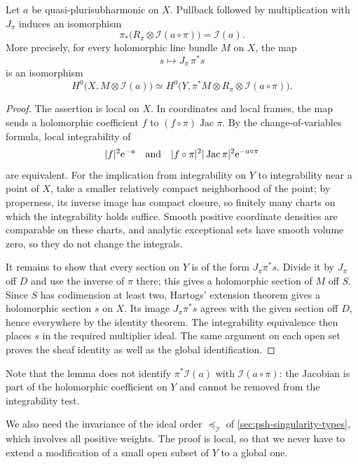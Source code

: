 \begin{lemma}\label{lem:adjoint-ideal-transform}
Let $a$ be quasi-plurisubharmonic on $X$. Pullback followed by multiplication with $J_\pi$ induces an isomorphism
\[
 \pi_*\bigl(R_\pi\otimes\mathcal I(a\circ\pi)\bigr)
       =\mathcal I(a).
\]
More precisely, for every holomorphic line bundle $M$ on $X$, the map
\[
 s\longmapsto J_\pi\,\pi^*s
\]
is an isomorphism
\[
 H^0\bigl(X,M\otimes\mathcal I(a)\bigr)
 \simeq H^0\bigl(Y,\pi^*M\otimes R_\pi
                         \otimes\mathcal I(a\circ\pi)\bigr).
\]
\end{lemma}
\begin{proof}
The assertion is local on $X$. In coordinates and local frames, the map sends a holomorphic coefficient $f$ to $(f\circ\pi)\operatorname{Jac}\pi$. By the change-of-variables formula, local integrability of
\[
 |f|^2\mathrm{e}^{-a}
 \quad\hbox{and}\quad
 |f\circ\pi|^2|\operatorname{Jac}\pi|^2\mathrm{e}^{-a\circ\pi}
\]
are equivalent. For the implication from integrability on $Y$ to integrability near a point of $X$, take a smaller relatively compact neighborhood of the point; by properness, its inverse image has compact closure, so finitely many charts on which the integrability holds suffice. Smooth positive coordinate densities are comparable on these charts, and analytic exceptional sets have smooth volume zero, so they do not change the integrals.

It remains to show that every section on $Y$ is of the form $J_\pi\pi^*s$. Divide it by $J_\pi$ off $D$ and use the inverse of $\pi$ there; this gives a holomorphic section of $M$ off $S$. Since $S$ has codimension at least two, Hartogs' extension theorem gives a holomorphic section $s$ on $X$. Its image $J_\pi\pi^*s$ agrees with the given section off $D$, hence everywhere by the identity theorem. The integrability equivalence then places $s$ in the required multiplier ideal. The same argument on each open set proves the sheaf identity as well as the global identification.
\end{proof}

Note that the lemma does not identify $\pi^*\mathcal I(a)$ with $\mathcal I(a\circ\pi)$: the Jacobian is part of the holomorphic coefficient on $Y$ and cannot be removed from the integrability test.

We also need the invariance of the ideal order $\preceq_{\mathcal I}$ of \cref{sec:psh-singularity-types}, which involves all positive weights. The proof is local, so that we never have to extend a modification of a small open subset of $Y$ to a global one.

